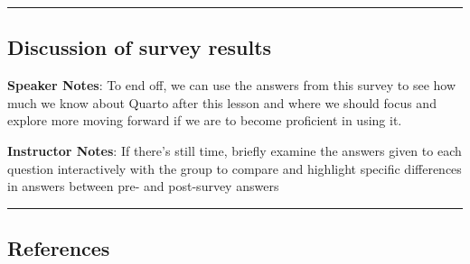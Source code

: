 \documentclass[
  letterpaper,
  DIV=11,
  numbers=noendperiod]{scrartcl}
\begin{document}
\begin{center}\rule{0.5\linewidth}{0.5pt}\end{center}

\subsection{Discussion of survey
results}\label{discussion-of-survey-results-1}

\textbf{Speaker Notes}: To end off, we can use the answers from this
survey to see how much we know about Quarto after this lesson and where
we should focus and explore more moving forward if we are to become
proficient in using it.

\textbf{Instructor Notes}: If there's still time, briefly examine the
answers given to each question interactively with the group to compare
and highlight specific differences in answers between pre- and
post-survey answers

\begin{center}\rule{0.5\linewidth}{0.5pt}\end{center}

\subsection{References}\label{references}
\end{document}
